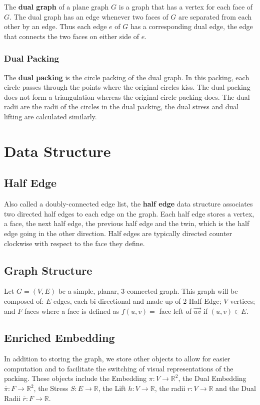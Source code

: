 \documentclass[english]{article}
\begin{document}
  The \textbf{dual graph} of a plane graph $G$ is a graph that has a vertex for each face of $G$. 
  The dual graph has an edge whenever two faces of $G$ are separated from each other by an edge. 
  Thus each edge $e$ of $G$ has a corresponding dual edge, the edge that connects the two faces on either side of $e$. 

  \subsubsection{Dual Packing}
  The \textbf{dual packing} is the circle packing of the dual graph. 
  In this packing, each circle passes through the points where the original circles kiss. 
  The dual packing does not form a triangulation whereas the original circle packing does.
  The dual radii are the radii of the circles in the dual packing, the dual stress and dual lifting are calculated similarly.

\section{Data Structure}
 \subsection{Half Edge}
  Also called a doubly-connected edge list, the \textbf{half edge} data structure associates two directed half edges to each edge on the graph. 
  Each half edge stores a vertex, a face, the next half edge, the previous half edge and the twin, which is the half edge going in the other direction. 
  Half edges are typically directed counter clockwise with respect to the face they define.
\subsection{Graph Structure}
  Let $G=(V,E)$ be a simple, planar, 3-connected graph. This graph will be composed of: $E$ edges, each bi-directional and made up of 2 Half Edge; $V$ vertices; and $F$ faces where a face is defined as $f(u,v) =$ face left of $\overrightarrow{uv}$ if $(u,v)\in E$.
\subsection{Enriched Embedding}
  In addition to storing the graph, we store other objects to allow for easier computation and to facilitate the switching of visual representations of the packing. These objects include the Embedding $\pi : V \rightarrow \mathbb{R}^2$, the Dual Embedding $\overline{\pi} : F \rightarrow \mathbb{R}^2$, the Stress $S : E \rightarrow \mathbb{R}$, the Lift $h : V \rightarrow \mathbb{R}$, the radii $r : V \rightarrow \mathbb{R}$ and the Dual Radii $\overline{r} : F \rightarrow \mathbb{R}$.
\end{document}
